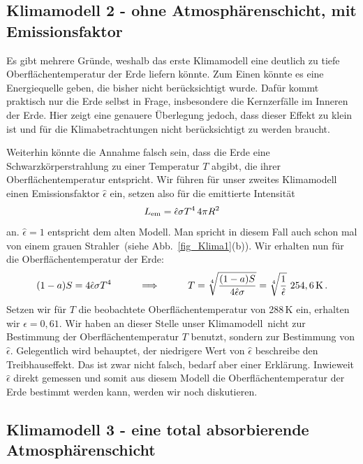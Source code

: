 \subsection{Klimamodell 2 - ohne Atmosph\"arenschicht, mit Emissionsfaktor}

Es gibt mehrere Gr\"unde, weshalb das erste Klimamodell eine deutlich zu tiefe
Oberfl\"achentemperatur der Erde liefern k\"onnte. Zum Einen
k\"onnte es eine Energiequelle geben, die bisher nicht ber\"ucksichtigt wurde. Daf\"ur
kommt praktisch nur die Erde selbst in Frage, insbesondere die Kernzerf\"alle im Inneren
der Erde. Hier zeigt eine genauere \"Uberlegung jedoch, dass dieser Effekt zu klein ist und
f\"ur die Klimabetrachtungen nicht ber\"ucksichtigt zu werden braucht.  

Weiterhin k\"onnte die Annahme falsch sein, dass die Erde eine Schwarzk\"orperstrahlung
zu einer Temperatur $T$ abgibt, die ihrer Oberfl\"achentemperatur entspricht. Wir f\"uhren f\"ur
unser zweites Klimamodell einen Emissionsfaktor $\hat{\epsilon}$ ein, setzen also f\"ur die
emittierte Intensit\"at
\begin{equation}
         L_{\rm em} = \hat{\epsilon} \sigma T^4 \, 4 \pi R^2 
\end{equation}
an. $\hat{\epsilon}=1$ entspricht dem alten Modell. Man spricht in diesem Fall auch schon mal
von einem \glqq grauen Strahler\grqq\ (siehe Abb.\ \ref{fig_Klima1}(b)). Wir erhalten nun f\"ur die
Oberfl\"achentemperatur der Erde:
\begin{equation}
      (1-a) S = 4 \hat{\epsilon} \sigma T^4 \hspace{1cm} \Longrightarrow \hspace{1cm}
          T = \sqrt[4]{\frac{(1-a) S}{4 \hat{\epsilon} \sigma}} = \sqrt[4]{\frac{1}{\hat{\epsilon}}} ~ 254,6\,{\rm K} \, .
\end{equation}
Setzen wir f\"ur $T$ die beobachtete Oberfl\"achentemperatur von 288\,K ein, erhalten
wir $\hat{\epsilon} = 0,61$. Wir haben an dieser Stelle unser \glqq Klimamodell\grqq\ nicht zur
Bestimmung der Oberfl\"achentemperatur $T$ benutzt, sondern zur Bestimmung von
$\hat{\epsilon}$. Gelegentlich wird behauptet, der niedrigere Wert von $\hat{\epsilon}$ beschreibe 
den Treibhauseffekt. Das ist zwar nicht falsch, bedarf aber einer Erkl\"arung. 
Inwieweit $\hat{\epsilon}$ direkt gemessen und somit aus diesem Modell die
Oberfl\"achentemperatur der Erde bestimmt werden kann, werden wir noch
diskutieren. 

\subsection{Klimamodell 3 - eine total absorbierende Atmosph\"arenschicht}

